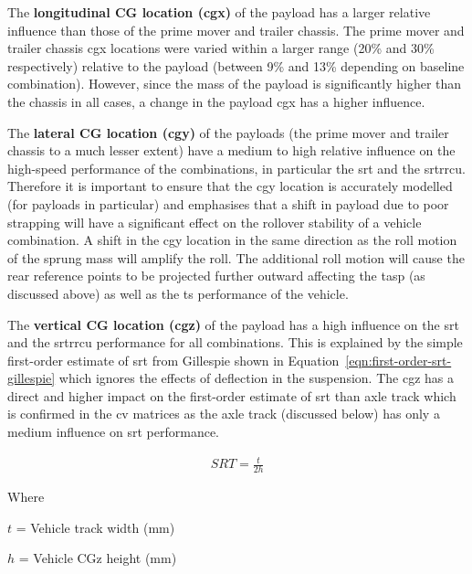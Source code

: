 The \textbf{longitudinal CG location (\gls{cgx})} of the payload has a larger relative influence than those of the prime mover and trailer chassis. The prime mover and trailer chassis \gls{cgx} locations were varied within a larger range (20\% and 30\% respectively) relative to the payload (between 9\% and 13\% depending on baseline combination). However, since the mass of the payload is significantly higher than the chassis in all cases, a change in the payload \gls{cgx} has a higher influence.

The \textbf{lateral CG location (\gls{cgy})} of the payloads (the prime mover and trailer chassis to a much lesser extent) have a medium to high relative influence on the high-speed performance of the combinations, in particular the \gls{srt} and the \gls{srtrrcu}. Therefore it is important to ensure that the \gls{cgy} location is accurately modelled (for payloads in particular) and emphasises that a shift in payload due to poor strapping will have a significant effect on the rollover stability of a vehicle combination. A shift in the \gls{cgy} location in the same direction as the roll motion of the sprung mass will amplify the roll. The additional roll motion will cause the rear reference points to be projected further outward affecting the \gls{tasp} (as discussed above) as well as the \gls{ts} performance of the vehicle.

The \textbf{vertical CG location (\gls{cgz})} of the payload has a high influence on the \gls{srt} and the \gls{srtrrcu} performance for all combinations. This is explained by the simple first-order estimate of \gls{srt} from Gillespie \cite{Gillespie1992} shown in Equation~\ref{eqn:first-order-srt-gillespie} which ignores the effects of deflection in the suspension. The \gls{cgz} has a direct and higher impact on the first-order estimate of \gls{srt} than axle track which is confirmed in the \gls{cv} matrices as the axle track (discussed below) has only a medium influence on \gls{srt} performance.

\begin{align}
	\label{eqn:first-order-srt-gillespie}
	SRT = \frac{t}{2h}
\end{align}

Where 

$t$ = Vehicle track width (mm)

$h$ = Vehicle CGz height (mm)


